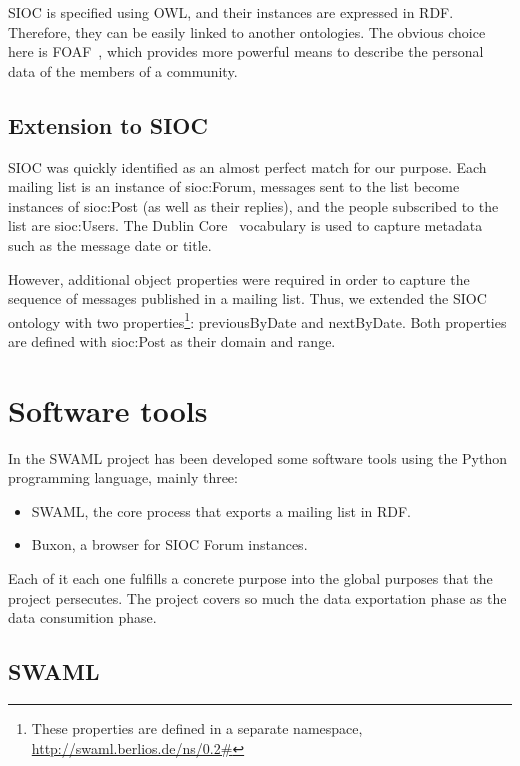 \documentclass{llncs}
\begin{document}
SIOC is specified using OWL, and their instances are expressed
in RDF. Therefore, they can be easily linked to another ontologies.
The obvious choice here is FOAF~\cite{FOAF}, which provides more
powerful means to describe the personal data of the members of
a community.

\subsection{Extension to SIOC}

SIOC was quickly identified as an almost perfect match for our
purpose. Each mailing list is an instance of \textsf{sioc:Forum},
messages sent to the list become instances of \textsf{sioc:Post}
(as well as their replies), and the people subscribed to the
list are \textsf{sioc:User}s. The Dublin Core~\cite{DublinCore}
vocabulary is used to capture metadata such as the message
date or title.

However, additional object properties were required
in order to capture the sequence of messages published in a
mailing list. Thus, we extended the SIOC ontology with two
properties\footnote{These properties are defined in a separate
namespace, \url{http://swaml.berlios.de/ns/0.2\#}}:
\textsf{previousByDate} and \textsf{nextByDate}. Both properties
are defined with \textsf{sioc:Post} as their domain and range.

\section{\label{sec:tools}Software tools}

In the SWAML project has been developed some software tools using the Python 
programming language, mainly three:

\begin{itemize}
 \item SWAML, the core process that exports a mailing list in RDF.
 \item Buxon, a browser for SIOC Forum instances.
\end{itemize}

Each of it each one fulfills a concrete purpose into the global purposes 
that the project persecutes. The project covers so much the data exportation 
phase as the data consumition phase.

\subsection{SWAML}
\end{document}
